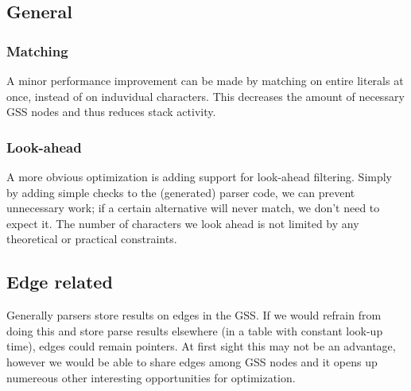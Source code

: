 \documentclass[a4paper,10pt]{article}
\begin{document}
\subsection{General}

\subsubsection{Matching}
A minor performance improvement can be made by matching on entire literals at once, instead of on induvidual characters. This decreases the amount of necessary GSS nodes and thus reduces stack activity.

\subsubsection{Look-ahead}
A more obvious optimization is adding support for look-ahead filtering. Simply by adding simple checks to the (generated) parser code, we can prevent unnecessary work; if a certain alternative will never match, we don't need to expect it. The number of characters we look ahead is not limited by any theoretical or practical constraints.

\subsection{Edge related}

Generally parsers store results on edges in the GSS. If we would refrain from doing this and store parse results elsewhere (in a table with constant look-up time), edges could remain pointers. At first sight this may not be an advantage, however we would be able to share edges among GSS nodes and it opens up numereous other interesting opportunities for optimization.
\end{document}
